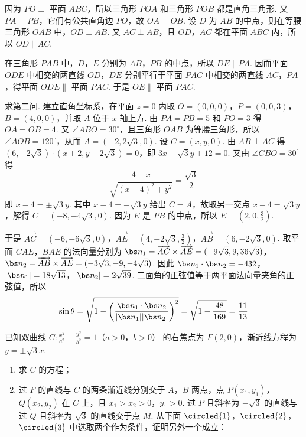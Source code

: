 \begin{solution}
因为 \(PO\perp\) 平面 \(ABC\)，所以三角形 \(POA\) 和三角形 \(POB\) 都是直角三角形. 又 \(PA=PB\)，它们有公共直角边 \(PO\)，故 \(OA=OB\). 设 \(D\) 为 \(AB\) 的中点，则在等腰三角形 \(OAB\) 中，\(OD\perp AB\). 又 \(AC\perp AB\)，且 \(OD\)，\(AC\) 都在平面 \(ABC\) 内，所以 \(OD\parallel AC\).

在三角形 \(PAB\) 中，\(D\)，\(E\) 分别为 \(AB\)，\(PB\) 的中点，所以 \(DE\parallel PA\). 因而平面 \(ODE\) 中相交的两直线 \(OD\)，\(DE\) 分别平行于平面 \(PAC\) 中相交的两直线 \(AC\)，\(PA\)，得平面 \(ODE\parallel\) 平面 \(PAC\). 于是 \(OE\parallel\) 平面 \(PAC\).

求第二问. 建立直角坐标系，在平面 \(z=0\) 内取 \(O=(0,0,0)\)，\(P=(0,0,3)\)，\(B=(4,0,0)\)，并取 \(A\) 位于 \(x\) 轴上方. 由 \(PA=PB=5\) 和 \(PO=3\) 得 \(OA=OB=4\). 又 \(\angle ABO=30^\circ\)，且三角形 \(OAB\) 为等腰三角形，所以 \(\angle AOB=120^\circ\)，从而
\(A=(-2,2\sqrt3,0)\). 设 \(C=(x,y,0)\). 由 \(AB\perp AC\) 得
\((6,-2\sqrt3)\cdot(x+2,y-2\sqrt3)=0\)，即 \(3x-\sqrt3y+12=0\). 又由 \(\angle CBO=30^\circ\) 得
\[
\frac{4-x}{\sqrt{(x-4)^2+y^2}}=\frac{\sqrt3}{2}
\]
即 \(x-4=\pm\sqrt3y\). 其中 \(x-4=-\sqrt3y\) 给出 \(C=A\)，故取另一交点 \(x-4=\sqrt3y\)，解得 \(C=(-8,-4\sqrt3,0)\). 因为 \(E\) 是 \(PB\) 的中点，所以 \(E=(2,0,\tfrac32)\).

于是
\(\overrightarrow{AC}=(-6,-6\sqrt3,0)\)，\(\overrightarrow{AE}=(4,-2\sqrt3,\tfrac32)\)，\(\overrightarrow{AB}=(6,-2\sqrt3,0)\).
取平面 \(CAE\)，\(BAE\) 的法向量分别为
\(\bs n_1=\overrightarrow{AC}\times\overrightarrow{AE}=(-9\sqrt3,9,36\sqrt3)\)，\(\bs n_2=\overrightarrow{AB}\times\overrightarrow{AE}=(-3\sqrt3,-9,-4\sqrt3)\).
因此
\(\bs n_1\cdot\bs n_2=-432\)，\(|\bs n_1|=18\sqrt{13}\)，\(|\bs n_2|=2\sqrt{39}\).
二面角的正弦值等于两平面法向量夹角的正弦值，所以
\[
\sin\theta=\sqrt{1-\left(\frac{\bs n_1\cdot\bs n_2}{|\bs n_1||\bs n_2|}\right)^2}
=\sqrt{1-\frac{48}{169}}=\frac{11}{13}
\]
\end{solution}


\begin{problem}
已知双曲线 \(C:\frac{x^2}{a^2}-\frac{y^2}{b^2}=1\)（\(a>0\)，\(b>0\)） 的右焦点为 \(F(2,0)\)，渐近线方程为 \(y=\pm \sqrt3 x\).
\begin{enumerate}
\item 求 \(C\) 的方程；
\item 过 \(F\) 的直线与 \(C\) 的两条渐近线分别交于 \(A\)，\(B\) 两点，点 \(P(x_1,y_1)\)，\(Q(x_2,y_2)\) 在 \(C\) 上，且 \(x_1>x_2>0\)，\(y_1>0\). 过 \(P\) 且斜率为 \(-\sqrt3\) 的直线与过 \(Q\) 且斜率为 \(\sqrt3\) 的直线交于点 \(M\). 从下面 \(\circled{1}\)，\(\circled{2}\)，\(\circled{3}\) 中选取两个作为条件，证明另外一个成立：
\end{enumerate}
\end{problem}

